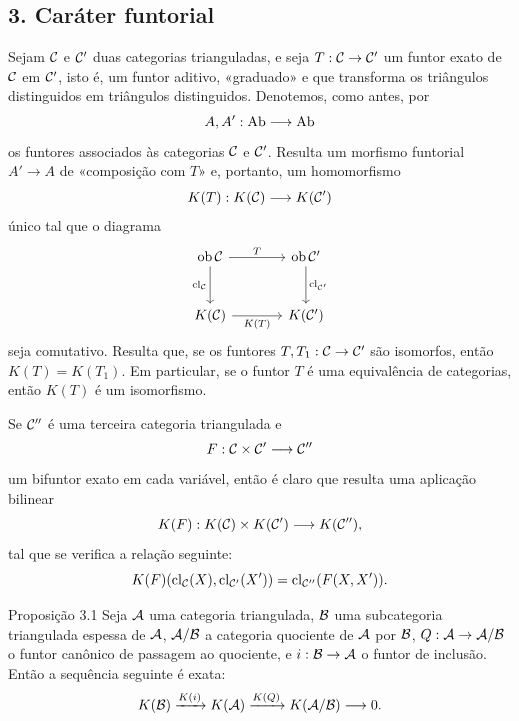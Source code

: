 \subsection*{3. Caráter funtorial}

Sejam $\mathcal C$ e $\mathcal C'$ duas categorias trianguladas, e seja $T:\mathcal C\to\mathcal C'$ um funtor exato de $\mathcal C$ em $\mathcal C'$, isto é, um funtor aditivo, «graduado» e que transforma os triângulos distinguidos em triângulos distinguidos. Denotemos, como antes, por
\[
A,A':\operatorname{Ab}\longrightarrow\operatorname{Ab}
\]
os funtores associados às categorias $\mathcal C$ e $\mathcal C'$. Resulta um morfismo funtorial $A'\to A$ de «composição com $T$» e, portanto, um homomorfismo
\[
K(T):K(\mathcal C)\longrightarrow K(\mathcal C')
\]
único tal que o diagrama
\[
\begin{tikzcd}[column sep=large,row sep=large]
\Ob\cC \arrow[r,"T"] \arrow[d,"\operatorname{cl}_{\cC}"']&
\Ob\cC' \arrow[d,"\operatorname{cl}_{\cC'}"]\\
K(\cC) \arrow[r,"K(T)"']& K(\cC')
\end{tikzcd}
\]
seja comutativo. Resulta que, se os funtores $T,T_1:\mathcal C\to\mathcal C'$ são isomorfos, então $K(T)=K(T_1)$. Em particular, se o funtor $T$ é uma equivalência de categorias, então $K(T)$ é um isomorfismo.

Se $\mathcal C''$ é uma terceira categoria triangulada e
\[
F:\mathcal C\times\mathcal C'\longrightarrow \mathcal C''
\]
um bifuntor exato em cada variável, então é claro que resulta uma aplicação bilinear
\[
K(F):K(\mathcal C)\times K(\mathcal C')\longrightarrow K(\mathcal C''),
\]
tal que se verifica a relação seguinte:
\[
K(F)(\operatorname{cl}_{\mathcal C}(X),\operatorname{cl}_{\mathcal C'}(X'))
=
\operatorname{cl}_{\mathcal C''}(F(X,X')).
\]

\begin{statement}{Proposição 3.1}
Seja $\mathcal A$ uma categoria triangulada, $\mathcal B$ uma subcategoria triangulada espessa de $\mathcal A$, $\mathcal A/\mathcal B$ a categoria quociente de $\mathcal A$ por $\mathcal B$, $Q:\mathcal A\to\mathcal A/\mathcal B$ o funtor canônico de passagem ao quociente, e $i:\mathcal B\to\mathcal A$ o funtor de inclusão. Então a sequência seguinte é exata:
\[
K(\mathcal B)\xrightarrow{K(i)}K(\mathcal A)\xrightarrow{K(Q)}K(\mathcal A/\mathcal B)\longrightarrow 0.
\]
\end{statement}
